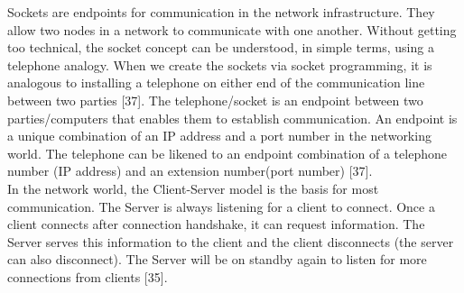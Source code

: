 \documentclass{uathesis}
\begin{document}
Sockets are endpoints for communication in the network infrastructure. They allow two nodes in a network to communicate with one another. Without getting too technical, the socket concept can be understood, in simple terms, using a telephone analogy. When we create the sockets via socket programming, it is analogous to installing a telephone on either end of the communication line between two parties [37]. The telephone/socket is an endpoint between two parties/computers that enables them to establish communication. An endpoint is a unique combination of an IP address and a port number in the networking world. The telephone can be likened to an endpoint combination of a telephone number (IP address) and an extension number(port number) [37]. \\

In the network world, the Client-Server model is the basis for most communication. The Server is always listening for a client to connect. Once a client connects after connection handshake, it can request information. The Server serves this information to the client and the client disconnects (the server can also disconnect). The Server will be on standby again to listen for more connections from clients [35]. \\
\end{document}
